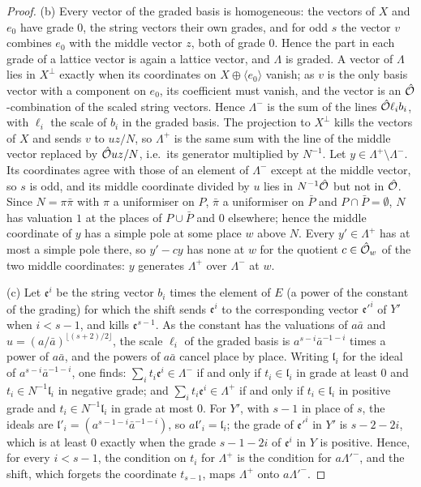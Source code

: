 \begin{proof}
(b) Every vector of the graded basis is homogeneous: the vectors of $X$ and $e_0$ have grade $0$, the string vectors their own grades, and for odd $s$ the vector $v$ combines $e_0$ with the middle vector $z$, both of grade $0$. Hence the part in each grade of a lattice vector is again a lattice vector, and $\Lambda$ is graded. A vector of $\Lambda$ lies in $X^\perp$ exactly
when its coordinates on $X\oplus\langle e_0\rangle$ vanish; as $v$ is the only basis vector with a component on $e_0$, its coefficient must vanish, and the vector is an $\hat{\mathcal{O}}$-combination of the scaled string vectors. Hence $\Lambda^-$ is the sum of the lines $\hat{\mathcal{O}}\ell_ib_i$, with $\ell_i$ the scale of $b_i$ in the graded basis. The projection to
$X^\perp$ kills the vectors of $X$ and sends $v$ to $uz/N$, so $\Lambda^+$ is the same sum with the line of the middle vector replaced by $\hat{\mathcal{O}} uz/N$, i.e.\ its generator multiplied by $N^{-1}$. Let $y\in\Lambda^+\setminus\Lambda^-$. Its coordinates agree with those of an element of $\Lambda^-$ except at the middle vector, so $s$ is odd, and its middle
coordinate divided by $u$ lies in $N^{-1}\hat{\mathcal{O}}$ but not in $\hat{\mathcal{O}}$. Since $N=\pi\bar\pi$ with $\pi$ a uniformiser on $P$, $\bar\pi$ a uniformiser on $\bar P$ and $P\cap\bar P=\emptyset$, $N$ has valuation $1$ at the places of $P\cup\bar P$ and $0$ elsewhere; hence the middle coordinate of $y$ has a simple pole at some place $w$ above $N$. Every
$y'\in\Lambda^+$ has at most a simple pole there, so $y'-cy$ has none at $w$ for the quotient $c\in\hat{\mathcal{O}}_w$ of the two middle coordinates: $y$ generates $\Lambda^+$ over $\Lambda^-$ at $w$.

(c) Let $\mathfrak e^i$ be the string vector $b_i$ times the element of $E$ (a power of the constant of the grading) for which the shift sends $\mathfrak e^i$ to the corresponding vector $\mathfrak e'^i$ of $Y'$ when $i<s-1$, and kills $\mathfrak e^{s-1}$. As the constant has the valuations of $a\bar a$ and
$u=(a/\bar a)^{\lfloor(s+2)/2\rfloor}$, the scale $\ell_i$ of the graded basis is $a^{s-i}\bar a^{-1-i}$ times a power of $a\bar a$, and the powers of $a\bar a$ cancel place by place. Writing $\mathfrak l_i$ for the ideal of $a^{s-i}\bar a^{-1-i}$, one finds: $\sum_it_i\mathfrak e^i\in\Lambda^-$ if and only if $t_i\in\mathfrak l_i$ in grade at least $0$ and
$t_i\in N^{-1}\mathfrak l_i$ in negative grade; and $\sum_it_i\mathfrak e^i\in\Lambda^+$ if and only if $t_i\in\mathfrak l_i$ in positive grade and $t_i\in N^{-1}\mathfrak l_i$ in grade at most $0$. For $Y'$, with $s-1$ in place of $s$, the ideals are $\mathfrak l'_i=(a^{s-1-i}\bar a^{-1-i})$, so $a\mathfrak l'_i=\mathfrak l_i$; the grade of $\mathfrak e'^i$ in $Y'$ is
$s-2-2i$, which is at least $0$ exactly when the grade $s-1-2i$ of $\mathfrak e^i$ in $Y$ is positive. Hence, for every $i<s-1$, the condition on $t_i$ for $\Lambda^+$ is the condition for $a\Lambda'^-$, and the shift, which forgets the coordinate $t_{s-1}$, maps $\Lambda^+$ onto $a\Lambda'^-$.


\end{proof}
